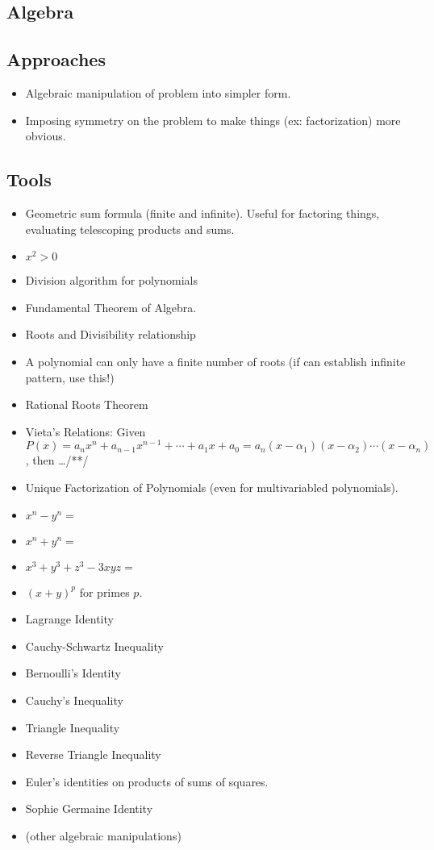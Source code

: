 \documentclass[12pt]{amsart}
\begin{document}
\begin{multicols}{2}
\section{Algebra}
\subsection{Approaches}
\begin{itemize}
    \item Algebraic manipulation of problem into simpler form.
    \item Imposing symmetry on the problem to make things (ex: factorization) more obvious.
\end{itemize}
\subsection{Tools}
\begin{itemize}
    \item Geometric sum formula (finite and infinite). Useful for factoring things, evaluating telescoping products and sums.
    \item $x^2 > 0$
    \item Division algorithm for polynomials
    \item Fundamental Theorem of Algebra.
    \item Roots and Divisibility relationship
    \item A polynomial can only have a finite number of roots (if can establish infinite pattern, use this!)
    \item Rational Roots Theorem
    \item Vieta's Relations: Given\\ $P(x) = a_n x^n+a_{n-1}x^{n-1}+\cdots+a_1x+a_0 = a_n(x-\alpha_1)(x-\alpha_2)\cdots(x-\alpha_n)$, then \dots /**/
    \item Unique Factorization of Polynomials (even for multivariabled polynomials).
    \item $x^n-y^n = $
    \item $x^n+y^n = $
    \item $x^3 + y^3 + z^3 - 3xyz = $
    \item $(x+y)^p$ for primes $p$.
    \item Lagrange Identity
    \item Cauchy-Schwartz Inequality
    \item Bernoulli's Identity
    \item Cauchy's Inequality
    \item Triangle Inequality
    \item Reverse Triangle Inequality
    \item Euler's identities on products of sums of squares.
    \item Sophie Germaine Identity
    \item (other algebraic manipulations)
\end{itemize}

\end{multicols}
\end{document}
